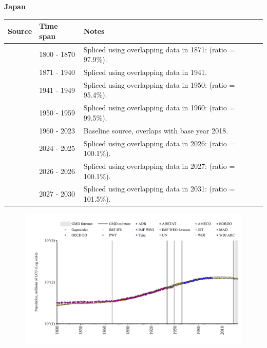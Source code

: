 \documentclass[12pt,a4paper,landscape]{article}
\begin{document}
\begin{adjustbox}{max totalsize={\paperwidth}{\paperheight},center}
\begin{minipage}[t][\textheight][t]{\textwidth}
\vspace*{0.5cm}
{}
\begin{center}
{\Large\bfseries Japan}
\end{center}
\vspace{0.5cm}
\begin{table}[H]
\centering
\small
\begin{tabular}{|l|l|l|}
\hline
\textbf{Source} & \textbf{Time span} & \textbf{Notes} \\
\hline
\rowcolor{white}\cite{Gapminder}& 1800 - 1870 &Spliced using overlapping data in 1871: (ratio = 97.9\%).\\
\rowcolor{lightgray}\cite{AHSTAT}& 1871 - 1940 &Spliced using overlapping data in 1941.\\
\rowcolor{white}\cite{Gapminder}& 1941 - 1949 &Spliced using overlapping data in 1950: (ratio = 95.4\%).\\
\rowcolor{lightgray}\cite{IMF_IFS}& 1950 - 1959 &Spliced using overlapping data in 1960: (ratio = 99.5\%).\\
\rowcolor{white}\cite{WDI}& 1960 - 2023 &Baseline source, overlaps with base year 2018.\\
\rowcolor{lightgray}\cite{OECD_EO}& 2024 - 2025 &Spliced using overlapping data in 2026: (ratio = 100.1\%).\\
\rowcolor{white}\cite{AMECO}& 2026 - 2026 &Spliced using overlapping data in 2027: (ratio = 100.1\%).\\
\rowcolor{lightgray}\cite{Gapminder}& 2027 - 2030 &Spliced using overlapping data in 2031: (ratio = 101.5\%).\\
\hline
\end{tabular}
\end{table}
\begin{figure}[H]
\centering
\includegraphics[width=\textwidth,height=0.6\textheight,keepaspectratio]{graphs/JPN_pop.pdf}
\end{figure}
\end{minipage}
\end{adjustbox}
\end{document}
